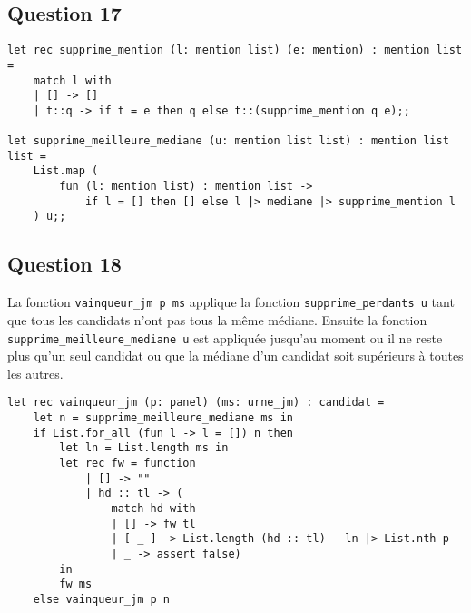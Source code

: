\documentclass[french, 10pt, a4paper]{article}
\begin{document}
\subsection{Question 17}

\begin{verbatim}
let rec supprime_mention (l: mention list) (e: mention) : mention list =
	match l with
	| [] -> []
	| t::q -> if t = e then q else t::(supprime_mention q e);;

let supprime_meilleure_mediane (u: mention list list) : mention list list =
	List.map (
		fun (l: mention list) : mention list ->
			if l = [] then [] else l |> mediane |> supprime_mention l
	) u;;
\end{verbatim}



\subsection{Question 18}

La fonction \texttt{vainqueur_jm p ms} applique la fonction \texttt{supprime_perdants u} tant que tous les candidats n'ont pas tous la même médiane. Ensuite la fonction \texttt{supprime_meilleure_mediane u} est appliquée jusqu'au moment ou il ne reste plus qu'un seul candidat ou que la médiane d'un candidat soit supérieurs à toutes les autres.

\begin{verbatim}
let rec vainqueur_jm (p: panel) (ms: urne_jm) : candidat =
	let n = supprime_meilleure_mediane ms in
	if List.for_all (fun l -> l = []) n then
		let ln = List.length ms in
		let rec fw = function
			| [] -> ""
			| hd :: tl -> (
				match hd with
				| [] -> fw tl
				| [ _ ] -> List.length (hd :: tl) - ln |> List.nth p
				| _ -> assert false)
		in
		fw ms
	else vainqueur_jm p n
\end{verbatim}
\end{document}
